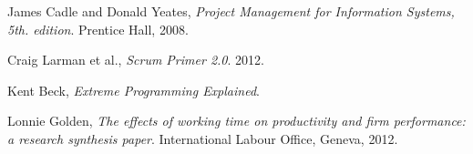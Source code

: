 \begin{thebibliography}{9}
	  James Cadle and Donald Yeates,
	  \emph{Project Management for Information Systems, 5th. edition}.
	  Prentice Hall,
	  2008.

    Craig Larman et al.,
    \emph{Scrum Primer 2.0}.
    2012.
    
    Kent Beck,
    \emph{Extreme Programming Explained}.
    
    Lonnie Golden,
    \emph{The effects of working time on productivity and firm performance: a research synthesis paper}.
    International Labour Office, Geneva,
    2012.
    
\end{thebibliography}